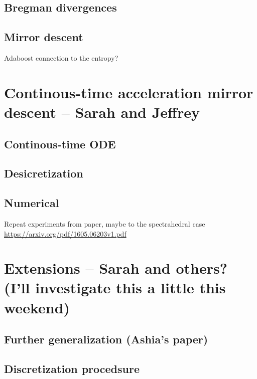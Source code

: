 \documentclass{article}
\begin{document}
\subsection{Bregman divergences}

\subsection{Mirror descent}
Adaboost connection to the entropy?

\section{Continous-time acceleration mirror descent -- Sarah and Jeffrey}

\subsection{Continous-time ODE}
\subsection{Desicretization}
\subsection{Numerical}
Repeat experiments from paper, maybe to the spectrahedral case \url{https://arxiv.org/pdf/1605.06203v1.pdf}

\section{Extensions -- Sarah and others? (I'll investigate this a little this weekend)}
\subsection{Further generalization (Ashia's paper)}
\subsection{Discretization procedsure}
\end{document}
